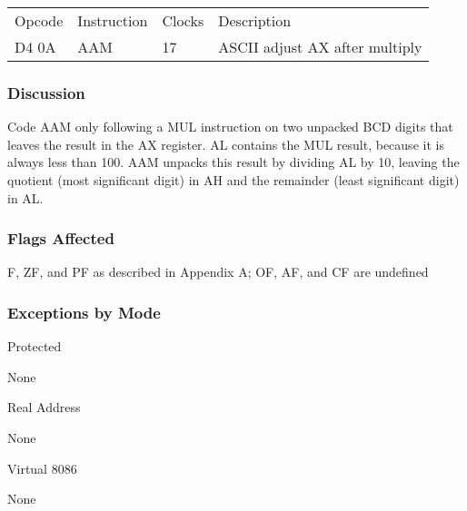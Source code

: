\begin{tabular}{l l l l}
Opcode & Instruction & Clocks & Description\\
D4 0A & AAM & 17 & ASCII adjust AX after multiply\\
\end{tabular}

\subsubsection{Discussion}

Code AAM only following a MUL instruction on two unpacked BCD digits that leaves the result in the AX register. AL contains the MUL result, because it is always less than 100. AAM unpacks this result by dividing AL by 10, leaving the quotient (most significant digit) in AH and the remainder (least significant digit) in AL.

\subsubsection{Flags Affected}
F, ZF, and PF as described in Appendix A; OF, AF, and CF are undefined

\subsubsection{Exceptions by Mode} 

Protected

None

Real Address

None

Virtual 8086

None
